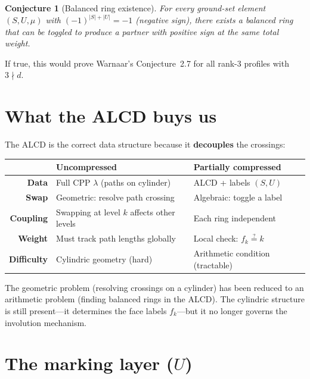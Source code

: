 \documentclass[11pt]{article}
\theoremstyle{plain}
\newtheorem{conjecture}[theorem]{Conjecture}
\theoremstyle{definition}
\begin{document}
\begin{conjecture}[Balanced ring existence]
\label{conj:balanced}
For every ground-set element $(S, U, \mu)$ with
$(-1)^{|S|+|U|} = -1$ (negative sign), there exists a
balanced ring that can be toggled to produce a partner
with positive sign at the same total weight.
\end{conjecture}

If true, this would prove Warnaar's Conjecture~2.7
for all rank-3 profiles with $3 \nmid d$.


\section{What the ALCD buys us}

The ALCD is the correct data structure because it
\textbf{decouples} the crossings:

\bigskip
\begin{center}
\renewcommand{\arraystretch}{1.4}
\begin{tabular}{r|p{5cm}|p{5cm}}
 & \textbf{Uncompressed} & \textbf{Partially compressed}
  \\ \hline
\textbf{Data} &
  Full CPP $\lambda$ (paths on cylinder) &
  ALCD + labels $(S, U)$ \\
\textbf{Swap} &
  Geometric: resolve path crossing &
  Algebraic: toggle a label \\
\textbf{Coupling} &
  Swapping at level $k$ affects other levels &
  Each ring independent \\
\textbf{Weight} &
  Must track path lengths globally &
  Local check: $f_k \stackrel{?}{=} k$ \\
\textbf{Difficulty} &
  Cylindric geometry (hard) &
  Arithmetic condition (tractable)
\end{tabular}
\end{center}

\bigskip\noindent
The geometric problem (resolving crossings on a cylinder)
has been reduced to an arithmetic problem (finding balanced
rings in the ALCD).  The cylindric structure is still
present---it determines the face labels $f_k$---but it no
longer governs the involution mechanism.


\section{The marking layer ($U$)}
\end{document}
